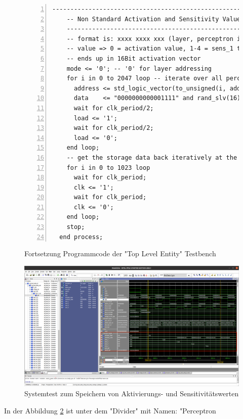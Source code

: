 \documentclass{article}
\numberwithin{equation}{section}
\begin{document}
\FloatBarrier
\begin{figure}[htbp]
\begin{lstlisting}[style=VHDL,numbers=left,stepnumber=1,style=myCustomMatlabStyle,basicstyle=\footnotesize]
    ----------------------------------------------------
    -- Non Standard Activation and Sensitivity Values --
    ----------------------------------------------------
    -- format is: xxxx xxxx xxx (layer, perceptron in layer, value)
    -- value => 0 = activation value, 1-4 = sens_1 to sens_4,
    -- ends up in 16Bit activation vector
    mode <= '0'; -- '0' for layer addressing
    for i in 0 to 2047 loop -- iterate over all perceptrons
      address <= std_logic_vector(to_unsigned(i, address'length));
      data    <= "0000000000001111" and rand_slv(16); -- set randome activation value
      wait for clk_period/2;
      load <= '1';
      wait for clk_period/2;
      load <= '0';
    end loop;
    -- get the storage data back iteratively at the output port
    for i in 0 to 1023 loop
      wait for clk_period;
      clk <= '1';
      wait for clk_period;
      clk <= '0';
    end loop;
    stop;
  end process;
\end{lstlisting}
\caption{Fortsetzung Programmcode der "Top Level Entity" Testbench} \label{code:top_level_entity_testbench2}
\end{figure}
\FloatBarrier
\begin{figure}[htb!]
    \begin{center}
      \includegraphics[width=15cm]{SimulationPictures/top_level_entyity_sens_sim.png}
    \end{center}
    \caption{Systemtest zum Speichern von Aktivierungs- und Sensitivitätswerten} \label{fig:system_params}
  \end{figure}
\FloatBarrier
In der Abbildung \ref{fig:system_params} ist unter dem "Divider" mit Namen: "Perceptron 
\end{document}
